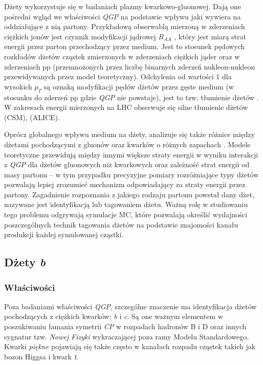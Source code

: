 Dżety wykorzystuje się w badaniach plazmy kwarkowo-gluonowej.
Dają one pośredni wgląd we właściwości \textit{QGP} na podstawie wpływu jaki wywiera na oddziałujące z nią partony. 
Przykładową obserwablą mierzoną w zderzeniach ciężkich jonów jest czynnik modyfikacji jądrowej $R_{AA}$ , który jest miarą strat energii przez parton przechodzący przez medium. Jest to stosunek pędowych rozkładów dżetów cząstek zmierzonych w zderzeniach ciężkich jąder oraz w zderzeniach pp (przemnożonych przez liczbę binarnych zderzeń nukleon-nukleon przewidywanych przez model teoretyczny). Odchylenia od wartości 1 dla wysokich $p_T$ są oznaką modyfikacji pędów dżetów przez gęste medium (w stosunku do zderzeń pp gdzie \textit{QGP} nie powstaje), jest to tzw. tłumienie dżetów . W zakresach energii mierzonych na LHC obserwuje się silne tłumienie dżetów \cite{Khachatryan:2016odn} (CSM), \cite{Abelev:2012hxa} (ALICE).

Oprócz globalnego wpływu medium na dżety, analizuje się także różnice między dżetami pochodzącymi z gluonów oraz kwarków o różnych zapachach . Modele teoretyczne przewidują między innymi większe straty energii w wyniku interakcji z \textit{QGP} dla dżetów gluonowych niż kwarkowych \cite{Salgado:2003gb} oraz zależność strat energii od masy partonu \cite{Dokshitzer:2001zm} -- w tym przypadku precyzyjne pomiary rozróżniające typy dżetów pozwalają lepiej zrozumieć mechanizm odpowiadający za straty energii przez partony. Zagadnienie rozpoznania z jakiego rodzaju partonu powstał dany dżet, nazywane jest identyfikacją lub tagowaniem dżetu.
Ważną rolę w studiowaniu tego problemu odgrywają symulacje MC, które pozwalają określić wydajności poszczególnych technik tagowania dżetów na podstawie znajomości kanału produkcji każdej symulowanej cząstki.

\subsection{Dżety \textit{b}}
\label{subsec:b-dzety}

\subsubsection{Właściwości}
Poza badaniami właściwości \textit{QGP}, szczególne znaczenie ma identyfikacja dżetów pochodzących z ciężkich kwarków: \textit{b} i \textit{c}.
Są one ważnym elementem w poszukiwaniu łamania symetrii \textit{CP} w rozpadach hadronów B i D oraz innych sygnatur tzw. \textit{Nowej Fizyki} wykraczającej poza ramy Modelu Standardowego. 
Kwarki \textit{piękne} pojawiają się także często w kanałach rozpadu cząstek takich jak bozon Higgsa i kwark \textit{t}.

